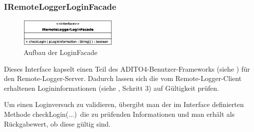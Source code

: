 \subsubsection{IRemoteLoggerLoginFacade}\label{sec:IRemoteLoggerLoginFacade}
\begin{figure}
	\vspace{-12px} \hspace{5px}
	\includegraphics[width=180px]{../img/CD-IRemoteLoggerLoginFacade.eps}
	\caption{Aufbau der \glqq LoginFacade\grqq}
\end{figure}
\par Dieses Interface kapselt einen Teil des ADITO4-Benutzer-Frameworks (siehe ) für den Remote-Logger-Server. Dadurch lassen sich die vom Remote-Logger-Client erhaltenen Logininformationen (siehe , Schritt 3) auf Gültigkeit prüfen.
\vspace{5px}
\par Um einen Loginversuch zu validieren, übergibt man der im Interface definierten Methode \glqq checkLogin(...)\grqq\ die zu prüfenden Informationen und man erhält als Rückgabewert, ob diese gültig sind. \\


